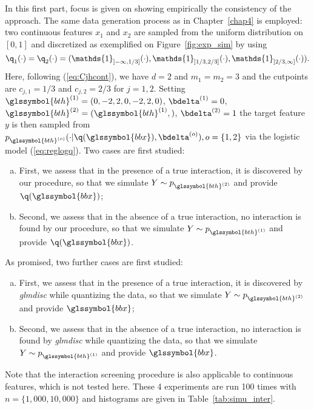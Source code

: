 In this first part, focus is given on showing empirically the consistency of the approach. The same data generation process as in Chapter~\ref{chap4} is employed: two continuous features $x_1$ and $x_2$ are sampled from the uniform distribution on $[0,1]$ and discretized as exemplified on Figure~\ref{fig:exp_sim} by using
\[\q_1(\cdot)=\q_2(\cdot) = (\mathds{1}_{]-\infty,1/3]}(\cdot),\mathds{1}_{]1/3,2/3]}(\cdot),\mathds{1}_{]2/3,\infty]}(\cdot)).\]
Here, following (\ref{eq:Cjhcont}), we have $d=2$ and $m_1=m_2=3$ and the cutpoints are $c_{j,1}=1/3$ and $c_{j,2}=2/3$ for $j=1,2$. Setting $\glssymbol{bth}^{(1)}=(0,-2,2,0,-2,2,0)$, $\bdelta^{(1)} = 0$, $\glssymbol{bth}^{(2)} = (\glssymbol{bth}^{(1)},)$, $\bdelta^{(2)} = 1$ the target feature $y$ is then sampled from $p_{\glssymbol{bth}^{(o)}}(\cdot | \q(\glssymbol{bbx}), \bdelta^{(o)}), o = \{1,2\}$ via the logistic model (\ref{eq:reglogq}). Two cases are first studied:
\begin{enumerate}[(a)]
    \item First, we assess that in the presence of a true interaction, it is discovered by our procedure, so that we simulate $Y \sim p_{\glssymbol{bth}^{(2)}}$ and provide $\q(\glssymbol{bbx})$;
    \item Second, we assess that in the absence of a true interaction, no interaction is found by our procedure, so that we simulate $Y \sim p_{\glssymbol{bth}^{(1)}}$ and provide $\q(\glssymbol{bbx})$.
\end{enumerate}
As promised, two further cases are first studied:
\begin{enumerate}[(a)]
    \item First, we assess that in the presence of a true interaction, it is discovered by \textit{glmdisc} while quantizing the data, so that we simulate $Y \sim p_{\glssymbol{bth}^{(2)}}$ and provide $\glssymbol{bbx}$;
    \item Second, we assess that in the absence of a true interaction, no interaction is found by \textit{glmdisc} while quantizing the data, so that we simulate $Y \sim p_{\glssymbol{bth}^{(1)}}$ and provide $\glssymbol{bbx}$.
\end{enumerate}
Note that the interaction screening procedure is also applicable to continuous features, which is not tested here. These 4 experiments are run 100 times with $n = \{1{,}000,10{,}000\}$ and histograms are given in Table~\ref{tab:simu_inter}.

